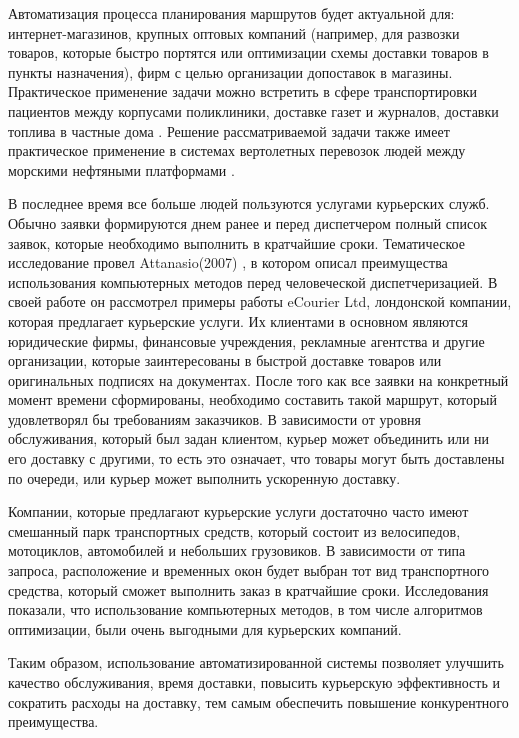 \documentclass[]{TAACpaper}
\begin{document}
Автоматизация процесса планирования маршрутов будет актуальной для:  интернет-магазинов, крупных оптовых компаний (например, для развозки товаров, которые быстро портятся или оптимизации схемы доставки товаров в пункты назначения), фирм с целью организации допоставок в магазины. Практическое применение задачи можно встретить в сфере транспортировки пациентов между корпусами поликлиники\cite{Beaudry, Kergosien}, доставке газет и журналов, доставки топлива в частные дома \cite{Sarak}. Решение рассматриваемой задачи также имеет практическое применение в системах вертолетных перевозок людей между морскими нефтяными платформами \cite{Romero}.

В последнее время все больше людей пользуются услугами курьерских служб.  Обычно заявки формируются днем ранее и
перед диспетчером полный список заявок, которые необходимо выполнить в кратчайшие сроки. Тематическое исследование провел Attanasio(2007) \cite{Attanasio}, в котором описал преимущества использования компьютерных методов перед человеческой диспетчеризацией. В своей работе он рассмотрел примеры работы eCourier Ltd, лондонской компании, которая предлагает курьерские услуги. Их клиентами в основном являются юридические фирмы, финансовые учреждения, рекламные агентства и другие организации, которые заинтересованы в быстрой доставке товаров или оригинальных подписях на документах. После того как все заявки на конкретный момент времени сформированы, необходимо составить такой маршрут, который удовлетворял бы требованиям заказчиков. В зависимости от уровня обслуживания, который был задан клиентом, курьер может объединить или ни его доставку с другими, то есть это означает, что товары могут быть доставлены по очереди, или курьер может выполнить ускоренную доставку. 

Компании, которые предлагают курьерские услуги достаточно часто имеют смешанный парк транспортных средств, который состоит из велосипедов, мотоциклов, автомобилей и небольших грузовиков. В зависимости от типа запроса, расположение и временных окон будет выбран тот вид транспортного средства, который сможет выполнить заказ в кратчайшие сроки. Исследования \cite{Attanasio} показали, что использование компьютерных методов, в том числе алгоритмов оптимизации, были очень выгодными для курьерских компаний.

Таким образом, использование автоматизированной системы позволяет улучшить качество обслуживания, время доставки, повысить курьерскую эффективность и сократить расходы на доставку, тем самым обеспечить повышение конкурентного преимущества.
\end{document}
